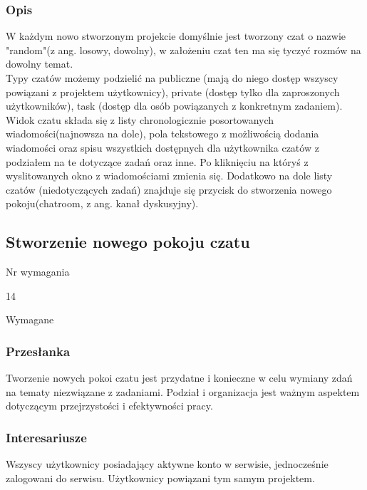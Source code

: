 \documentclass[eng,printmode]{mgr}
\begin{document}
\subsubsection{Opis}
W każdym nowo stworzonym projekcie domyślnie jest tworzony czat o nazwie "random"(z ang. losowy, dowolny), w założeniu czat ten ma się tyczyć rozmów na dowolny temat. \\
Typy czatów możemy podzielić na publiczne (mają do niego dostęp wszyscy powiązani z projektem użytkownicy), private (dostęp tylko dla zaproszonych użytkowników), task (dostęp dla osób powiązanych z konkretnym zadaniem).
\\
Widok czatu składa się z listy chronologicznie posortowanych wiadomości(najnowsza na dole), pola tekstowego z możliwością dodania wiadomości oraz spisu wszystkich dostępnych dla użytkownika czatów z podziałem na te dotyczące zadań oraz inne. Po kliknięciu na któryś z wyslitowanych okno z wiadomościami zmienia się. Dodatkowo na dole listy czatów (niedotyczących zadań) znajduje się przycisk do stworzenia nowego pokoju(chatroom, z ang. kanał dyskusyjny).

\subsection{Stworzenie nowego pokoju czatu}
\begin{labeling}{Nr wymagania}
\item [Nr wymagania:] 14
\item [Priorytet:] Wymagane
\end{labeling}

\subsubsection{Przesłanka}
Tworzenie nowych pokoi czatu jest przydatne i konieczne w celu wymiany zdań na tematy niezwiązane z zadaniami. Podział i organizacja jest ważnym aspektem dotyczącym przejrzystości i efektywności pracy.

\subsubsection{Interesariusze}
Wszyscy użytkownicy posiadający aktywne konto w serwisie, jednocześnie zalogowani do serwisu. Użytkownicy powiązani tym samym projektem.
\end{document}
